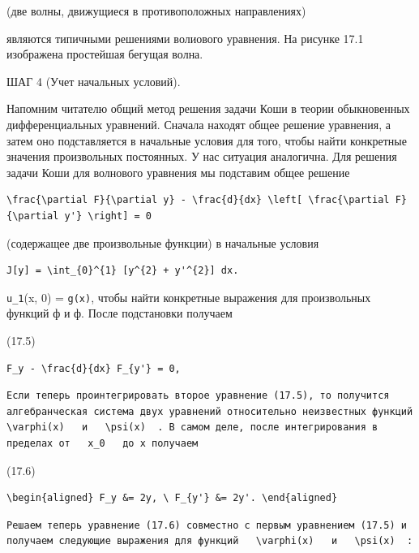 \documentclass[
  ukrainian,
]{article}
\begin{document}
(две волны, движущиеся в противоположных направлениях)

являются типичными решениями волиового уравнения. На рисунке 17.1
изображена простейшая бегущая волна.

ШАГ 4 (Учет начальных условий).

Напомним читателю общий метод решения задачи Коши в теории обыкновенных
дифференциальных уравнений. Сначала находят общее решение уравнения, а
затем оно подставляется в начальные условия для того, чтобы найти
конкретные значения произвольных постоянных. У нас ситуация аналогична.
Для решения задачи Коши для волнового уравнения мы подставим общее
решение

\begin{verbatim}
\frac{\partial F}{\partial y} - \frac{d}{dx} \left[ \frac{\partial F}{\partial y'} \right] = 0
\end{verbatim}

(содержащее две произвольные функции) в начальные условия

\begin{verbatim}
J[y] = \int_{0}^{1} [y^{2} + y'^{2}] dx.
\end{verbatim}

\texttt{u\_1}(x, 0) = \texttt{g(x)}, чтобы найти конкретные выражения
для произвольных функций ф и ф. После подстановки получаем

(17.5)

\begin{verbatim}
F_y - \frac{d}{dx} F_{y'} = 0,
\end{verbatim}

\begin{verbatim}
Если теперь проинтегрировать второе уравнение (17.5), то получится алгебранческая система двух уравнений относительно неизвестных функций   \varphi(x)   и   \psi(x)  . В самом деле, после интегрирования в пределах от   x_0   до x получаем
\end{verbatim}

(17.6)

\begin{verbatim}
\begin{aligned} F_y &= 2y, \ F_{y'} &= 2y'. \end{aligned}
\end{verbatim}

\begin{verbatim}
Решаем теперь уравнение (17.6) совместно с первым уравнением (17.5) и получаем следующие выражения для функций   \varphi(x)   и   \psi(x)  :
\end{verbatim}
\end{document}
